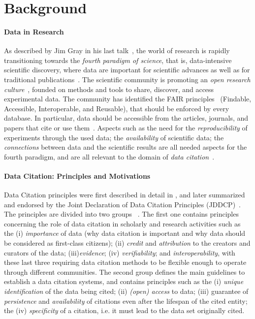 \section{Background}
\label{sec:related}

\paragraph{Data in Research} As described by Jim Gray in his last talk~\citep{hey2009jim}, the world of research is rapidly transitioning towards the \emph{fourth paradigm of science}, that is, data-intensive scientific discovery, where data are important for scientific advances as well as for traditional publications~\citep{Bechhofer2013linkisnotenough}.
The scientific community is promoting an \emph{open research culture}~\citep{nosek2015promoting}, founded on methods and tools to share, discover, and access experimental data. 
The community has identified the FAIR principles~\citep{fair2016Wilikinson} (Findable, Accessible, Interoperable, and Reusable), that should be enforced by every database. 
In particular, data should be accessible from the articles, journals, and papers that cite or use them~\citep{cousijn2019bringing}.
Aspects such as the need for the \emph{reproducibility} of experiments through the used data; the \emph{availability} of scientific data; the \emph{connections} between data and the scientific results are all needed aspects for the fourth paradigm, and are all relevant to the domain of \emph{data citation}~\citep{honor2016data}.

\paragraph{Data Citation: Principles and Motivations} Data Citation principles were first described in detail in \citep{CODATA2013}, and later summarized and endorsed by the Joint Declaration of Data Citation Principles (JDDCP)~\citep{martone2014joint}. 
The principles are divided into two groups~ \citep{Silvello18jasist}. The first one contains principles concerning the role of data citation in scholarly and research activities such as the (i) \emph{importance} of data (why data citation is important and why data should be considered as first-class citizens); (ii) \emph{credit} and \emph{attribution} to the creators and curators of the data; (iii)\emph{evidence}; (iv) \emph{verifiability}; and \emph{interoperability}, with these last three requiring data citation methods to be flexible enough to operate through different communities. 
The second group defines the main guidelines to establish a data citation systems, and contains principles such as the (i) \emph{unique identification} of the data being cited; (ii) \emph{(open) access} to data; (iii) guarantee of \emph{persistence} and \emph{availability} of citations even after the lifespan of the cited entity; the (iv) \emph{specificity} of a citation, i.e. it must lead to the data set originally cited.

